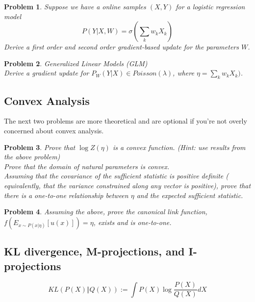\documentclass[a4paper]{article}
\newtheorem{problem}{Problem}[section]
\begin{document}
\begin{problem}
  Suppose we have a online samples ${(X,Y)}$ for a logistic regression model
  \begin{equation}
    P( Y \vert X, W) = \sigma( \sum_k w_k X_k )
    \label{logistic}
  \end{equation}
  Derive a first order and second order gradient-based update for the parameters $W$.
\end{problem}

\begin{problem} Generalized Linear Models (GLM) \\
  Derive a gradient update for $P_W( Y \vert X) \in Poisson(\lambda) $, where $\eta = \sum_k w_k X_k )$.
\end{problem}

\subsection{Convex Analysis}

The next two problems are more theoretical and are optional if you're not overly concerned about convex analysis.
\begin{problem}
Prove that $ \log Z(\eta)$ is a convex function. 
(Hint: use results from the above problem)  \\
Prove that the domain of natural parameters is convex.  \\
Assuming that the covariance of the sufficient statistic is positive definite ( equivalently, that the variance constrained along any vector is positive), prove that there is a one-to-one relationship between $\eta$ and the expected sufficient statistic.
\end{problem}

\begin{problem}
Assuming the above, prove the canonical link function, $f( E_{ x \sim P( x \vert \eta) } [ u(x) ] ) = \eta $, exists and is one-to-one.
\end{problem}

\subsection{KL divergence, M-projections, and I-projections}

\begin{equation}
  KL \left( P(X) \Vert Q(X) \right) := \int P(X) \log \frac{P(X)}{Q(X)} dX
  \label{KL}
\end{equation}
\end{document}
